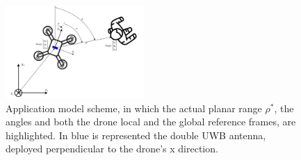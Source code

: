\begin{figure}
    \centering
    \includegraphics[width=0.47\textwidth]{images/Scheme_drone_tag.png}
    \caption{Application model scheme, in which the actual planar range $\rho^*$, the angles and both the drone local and the global reference frames, are highlighted. In blue is represented the double UWB antenna, deployed perpendicular to the drone's x direction.}
    \label{PRFOR:fig:dronetag_scheme}
\end{figure}


